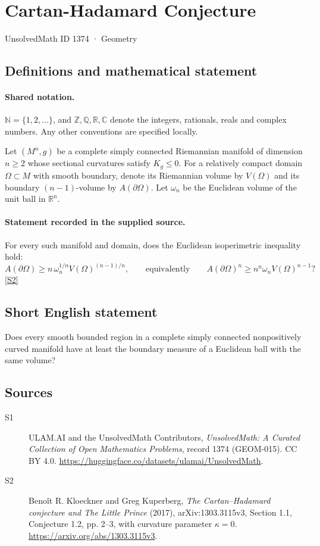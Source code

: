 \documentclass[11pt]{article}
\newcommand{\sref}[2]{\hyperlink{source:#1:#2}{[S#2]}}
\begin{document}
\setcounter{section}{1373}
\section{Cartan-Hadamard Conjecture}\label{1374}
{\small\sffamily UnsolvedMath ID 1374 · Geometry}
\subsection{Definitions and mathematical statement}

\paragraph{Shared notation.}$\mathbb N=\{1,2,\ldots\}$, and $\mathbb Z,\mathbb Q,\mathbb R,\mathbb C$ denote the integers, rationals, reals and complex numbers. Any other conventions are specified locally.


Let $(M^n,g)$ be a complete simply connected Riemannian manifold of dimension $n\ge2$ whose sectional curvatures satisfy $K_g\le0$. For a relatively compact domain $\Omega\subset M$ with smooth boundary, denote its Riemannian volume by $V(\Omega)$ and its boundary $(n-1)$-volume by $A(\partial\Omega)$. Let $\omega_n$ be the Euclidean volume of the unit ball in $\mathbb R^n$.
\paragraph{Statement recorded in the supplied source.}
For every such manifold and domain, does the Euclidean isoperimetric inequality hold:
\[
 A(\partial\Omega)\ge n\,\omega_n^{1/n}V(\Omega)^{(n-1)/n},
 \qquad\text{equivalently}\qquad
 A(\partial\Omega)^n\ge n^n\omega_n V(\Omega)^{n-1}?
\]
\sref{1374}{2}
\subsection{Short English statement}
Does every smooth bounded region in a complete simply connected nonpositively curved manifold have at least the boundary measure of a Euclidean ball with the same volume?
\subsection{Sources}
\begin{description}
\item[\hypertarget{source:1374:1}{S1}] ULAM.AI and the UnsolvedMath Contributors, \emph{UnsolvedMath: A Curated Collection of Open Mathematics Problems}, record 1374 (GEOM-015). CC BY 4.0. \url{https://huggingface.co/datasets/ulamai/UnsolvedMath}.
\item[\hypertarget{source:1374:2}{S2}] Benoît R. Kloeckner and Greg Kuperberg, \emph{The Cartan--Hadamard conjecture and The Little Prince} (2017), arXiv:1303.3115v3, Section 1.1, Conjecture 1.2, pp. 2--3, with curvature parameter $\kappa=0$. \url{https://arxiv.org/abs/1303.3115v3}.
\end{description}
\label{end:1374}
\end{document}
